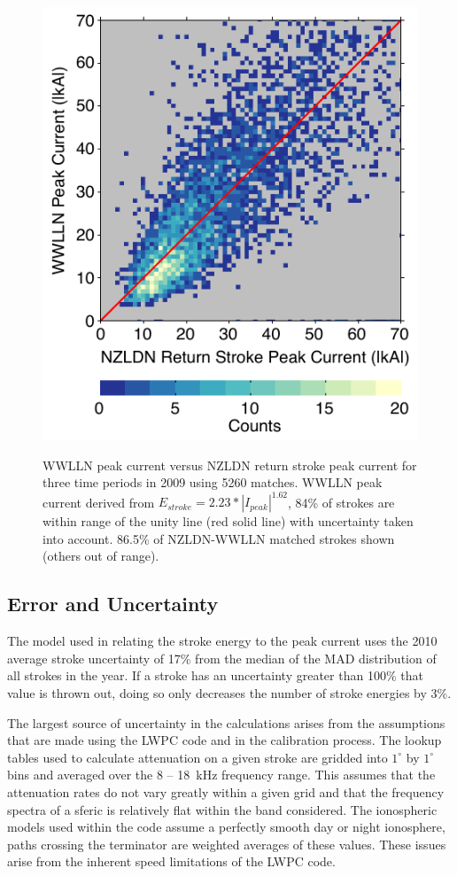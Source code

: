 \begin{figure}[ht!]
\centering
\includegraphics[scale=1]{energy/Figures/PPS_PvI_Error.pdf}\\
\caption{WWLLN peak current versus NZLDN return stroke peak current for three time periods in 2009 using 5260 matches. WWLLN peak current derived from $E_{stroke} = 2.23 * |I_{peak}|^{1.62}$, 84\% of strokes are within range of the unity line (red solid line) with uncertainty taken into account. 86.5\% of NZLDN-WWLLN matched strokes shown (others out of range).}
\label{energy:fig:pvi}
\end{figure}

\subsection{Error and Uncertainty}

The model used in relating the stroke energy to the peak current uses the 2010 average stroke uncertainty of 17\% from the median of the MAD distribution of all strokes in the year.
If a stroke has an uncertainty greater than 100\% that value is thrown out, doing so only decreases the number of stroke energies by 3\%.

The largest source of uncertainty in the calculations arises from the assumptions that are made using the LWPC code and in the calibration process.
The lookup tables used to calculate attenuation on a given stroke are gridded into $1^{\circ}$ by $1^{\circ}$ bins and averaged over the 8 -- 18~kHz frequency range.
This assumes that the attenuation rates do not vary greatly within a given grid and that the frequency spectra of a sferic is relatively flat within the band considered.
The ionospheric models used within the code assume a perfectly smooth day or night ionosphere, paths crossing the terminator are weighted averages of these values.
These issues arise from the inherent speed limitations of the LWPC code.

